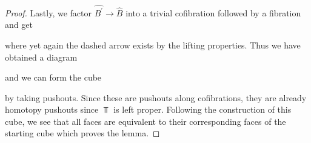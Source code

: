 \begin{lemma}
\begin{proof}
        Lastly, we factor $\widehat{B^{\prime}}\to\widehat{B}$ into a trivial cofibration followed by a fibration and get
        \begin{center}
        \end{center} 
        where yet again the dashed arrow exists by the lifting properties.
        Thus we have obtained a diagram
        \begin{center}
        \end{center}
        and we can form the cube 
        \begin{center}
        \end{center}
        by taking pushouts.
        Since these are pushouts along cofibrations, they are already homotopy pushouts since $\Top$ is left proper. %
        Following the construction of this cube, we see that all faces are equivalent to their corresponding faces of the starting cube which proves the lemma.
    \end{proof}
\end{lemma}
